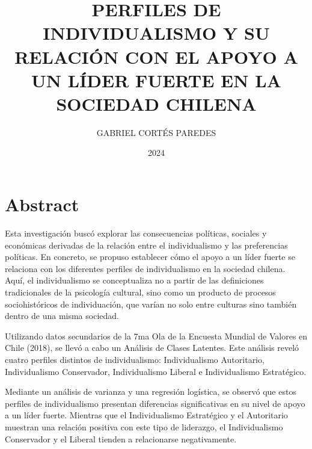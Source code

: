\documentclass[12pt,oneside]{templates/facsothesis}
\title{PERFILES DE INDIVIDUALISMO Y SU RELACIÓN CON EL APOYO A UN LÍDER FUERTE EN LA SOCIEDAD CHILENA}
\author{GABRIEL CORTÉS PAREDES}
\date{2024}
\begin{document}
\raggedbottom

  \maketitle

\frontmatter %
 \pagestyle{empty} 





\setlength\parskip{1em plus 0.1em minus 0.2em}




\mainmatter %
\titleformat{\chapter}{\normalfont\Huge\bfseries}{\thechapter}{1em}{}
\pagestyle{fancyplain} %

\hypertarget{abstract}{%
\chapter*{Abstract}\label{abstract}}

Esta investigación buscó explorar las consecuencias políticas, sociales y económicas derivadas de la relación entre el individualismo y las preferencias políticas. En concreto, se propuso establecer cómo el apoyo a un líder fuerte se relaciona con los diferentes perfiles de individualismo en la sociedad chilena. Aquí, el individualismo se conceptualiza no a partir de las definiciones tradicionales de la psicología cultural, sino como un producto de procesos sociohistóricos de individuación, que varían no solo entre culturas sino también dentro de una misma sociedad.

Utilizando datos secundarios de la 7ma Ola de la Encuesta Mundial de Valores en Chile (2018), se llevó a cabo un Análisis de Clases Latentes. Este análisis reveló cuatro perfiles distintos de individualismo: Individualismo Autoritario, Individualismo Conservador, Individualismo Liberal e Individualismo Estratégico.

Mediante un análisis de varianza y una regresión logística, se observó que estos perfiles de individualismo presentan diferencias significativas en su nivel de apoyo a un líder fuerte. Mientras que el Individualismo Estratégico y el Autoritario muestran una relación positiva con este tipo de liderazgo, el Individualismo Conservador y el Liberal tienden a relacionarse negativamente.
\end{document}
